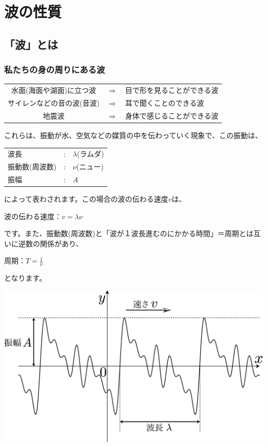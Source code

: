 %
%


\section{波の性質}

\subsection{「波」とは}

\subsubsection*{私たちの身の周りにある波}

\begin{center}
\begin{tabular}{ccl}
水面(海面や湖面)に立つ波 & $\Rightarrow$ & 目で形を見ることができる波\\
サイレンなどの音の波(音波) &  $\Rightarrow$ & 耳で聞くことのできる波\\
地震波 & $\Rightarrow$ & 身体で感じることができる波
\end{tabular}
\end{center}

これらは、振動が水、空気などの媒質の中を伝わっていく現象で、この振動は、
\begin{center}
\begin{tabular}{lcl}
波長 &:&$\lambda$(ラムダ)\\
振動数(周波数)&:&$\nu$(ニュー)\\
振幅&:&$A$\\
\end{tabular}
\end{center}
によって表わされます。この場合の波の伝わる速度$v$は、
\begin{center}
波の伝わる速度：$v=\lambda \nu$
\end{center}
です。また、振動数(周波数)と「波が１波長進むのにかかる時間」＝周期とは互いに逆数の関係があり、
\begin{center}
周期：$T=\frac{1}{\nu}$
\end{center}
となります。
\begin{center}
\includegraphics[scale=0.18]{01_Wave/wave1.eps}
\end{center}

